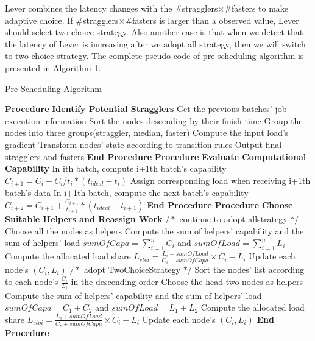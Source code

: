 \documentclass[10pt,conference,compsocconf,letterpaper]{IEEEtran}
\begin{document}
  Lever combines the latency changes with the \#stragglers$\times$\#fasters to make adaptive choice. If \#stragglers$\times$\#fasters is larger than a observed value, Lever should select two choice strategy. Also another case is that when we detect that the latency of Lever is increasing after we adopt all strategy, then we will switch to two choice strategy. The complete pseudo code of pre-scheduling algorithm is presented in Algorithm 1.
  \begin{algorithm}[htbp]
  \small
  \caption{Pre-Scheduling Algorithm}
  \label{Alg:1}
  \begin{algorithmic}[1]
  \STATE \textbf{Procedure} \textbf{Identify Potential Stragglers}
  \STATE \quad Get the previous batches' job execution information
  \STATE \quad Sort the nodes descending by their finish time
  \STATE \quad Group the nodes into three groups(straggler, median, faster)
  \STATE \quad Compute the input load's gradient
  \STATE \quad Transform nodes' state according to transition rules
  \STATE \quad Output final stragglers and fasters
  \STATE \textbf{End Procedure}
  \STATE \textbf{Procedure} \textbf{Evaluate Computational Capability}
  \STATE \quad In ith batch, compute i+1th batch's capability
  \STATE \quad $C_{i+1} = C_i + C_i/t_i*(t_{ideal}-t_i)$
  \STATE \quad Assign corresponding load when receiving i+1th batch's data
  \STATE \quad In i+1th batch, compute the next batch's capability
  \STATE \quad $C_{i+2} = C_{i+1} + \frac{C_{i+1}}{t_{i+1}}*(t_{ideal}-t_{i+1})$
  \STATE \textbf{End Procedure}
  \STATE \textbf{Procedure} \textbf{Choose Suitable Helpers and Reassign Work}
  \STATE $/*$ continue to adopt allstrategy $*/$
  \STATE Choose all the nodes as helpers
  \STATE Compute the sum of helpers' capability and the sum of helpers' load
  \STATE $sumOfCapa=\sum_{i=1}^n C_i$ and $sumOfLoad=\sum_{i=1}^n L_i$
  \STATE Compute the allocated load share
  \STATE $L_{stoi}=\frac{L_s + sumOfLoad}{C_s + sumOfCapa}\times C_i-L_i$
  \STATE Update each node's $(C_i,L_i)$
  \ENDFOR
  \ENDFOR
  \ELSE
  \STATE $/*$ adopt TwoChoiceStrategy $*/$
  \STATE Sort the nodes' list according to each node's $\frac{C_i}{L_i}$ in the descending order
  \STATE Choose the head two nodes as helpers
  \STATE Compute the sum of helpers' capability and the sum of helpers' load
  \STATE $sumOfCapa = C_1 + C_2$ and $sumOfLoad = L_1 + L_2$
  \STATE Compute the allocated load share
  \STATE $L_{stoi}=\frac{L_s + sumOfLoad}{C_s + sumOfCapa}\times C_i-L_i$
  \STATE Update each node's $(C_i,L_i)$
  \ENDFOR
  \ENDFOR
  \ENDIF
  \STATE \textbf{End Procedure}
  \end{algorithmic}
  \end{algorithm}
\end{document}
